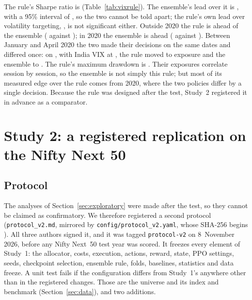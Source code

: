 \documentclass[11pt]{article}
\begin{document}
The rule's Sharpe ratio is \VRsr{} (Table~\ref{tab:vixrule}). The ensemble's lead over it is \VRdelta{}, with a 95\% interval of \VRci{}, so the two cannot be told apart; the rule's own lead over volatility targeting, \VRvsVT{} \VRvsVTci{}, is not significant either. Outside 2020 the rule is ahead of the ensemble (\VRnoRule{} against \VRnoPPO{}); in 2020 the ensemble is ahead (\VRtwentyPPO{} against \VRtwentyRule{}). Between January and April 2020 the two made their \NCrashDates{} decisions on the same dates and differed once: on \CrashDiffDate{}, with India VIX at \VixCrash{}, the rule moved to exposure \VRCrashExp{} and the ensemble to \PPOCrashExp{}. The rule's maximum drawdown is \VRmdd{}. Their exposures correlate \VRcorr{} session by session, so the ensemble is not simply this rule; but most of its measured edge over the rule comes from 2020, where the two policies differ by a single decision. Because the rule was designed after the test, Study~2 registered it in advance as a comparator.

\section{Study 2: a registered replication on the Nifty Next 50}\label{sec:study2}

\subsection{Protocol}

The analyses of Section~\ref{sec:exploratory} were made after the test, so they cannot be claimed as confirmatory. We therefore registered a second protocol (\texttt{protocol\_v2.md}, mirrored by \texttt{config/\allowbreak protocol\_v2.yaml}, whose SHA-256 begins \NxProtoHash{}). All three authors signed it, and it was tagged \texttt{protocol-v2} on 8~November 2026, before any Nifty Next~50 test year was scored. It freezes every element of Study~1: the allocator, costs, execution, actions, reward, state, PPO settings, seeds, checkpoint selection, ensemble rule, folds, baselines, statistics and data freeze. A unit test fails if the configuration differs from Study~1's anywhere other than in the registered changes. Those are the universe and its index and benchmark (Section~\ref{sec:data}), and two additions.
\end{document}
